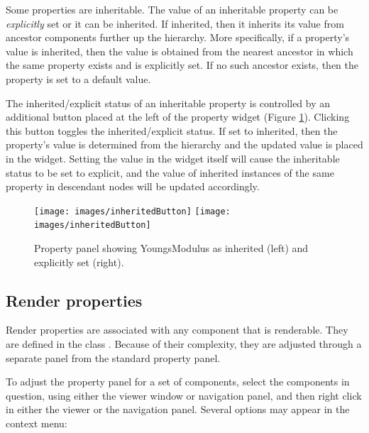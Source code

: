 \documentclass{article}
\begin{document}
Some properties are inheritable. The value of an inheritable property
can be {\it explicitly} set or it can be inherited.  If inherited, then it
inherits its value from ancestor components further up the hierarchy.
More specifically, if a property's value is inherited, then the value
is obtained from the nearest ancestor in which the same property
exists and is explicitly set.  If no such ancestor exists, then the
property is set to a default value.

The inherited/explicit status of an inheritable property is controlled
by an additional button placed at the left of the property widget
(Figure \ref{inheritedButtonFig}).  Clicking this button toggles the
inherited/explicit status.  If set to inherited, then the property's
value is determined from the hierarchy and the updated value is placed
in the widget.  Setting the value in the widget itself will cause the
inheritable status to be set to explicit, and the value of inherited
instances of the same property in descendant nodes will be updated
accordingly.

\begin{figure}
\begin{center}
\iflatexml
\texttt{[image: images/inheritedButton]}
\else
\texttt{[image: images/inheritedButton]}
\fi
\end{center}
\caption{Property panel showing YoungsModulus as inherited (left) and 
explicitly set (right).}%
\label{inheritedButtonFig}
\end{figure}

\subsection{Render properties}

Render properties are associated with any component that is
renderable. They are defined in the class 
. 
Because of their complexity, they are adjusted
through a separate panel from the standard property panel.

To adjust the property panel for a set of components, select the components
in question, using either the viewer window or navigation panel, and then right 
click in either the viewer or the navigation panel. Several options may appear
in the context menu:
\end{document}
